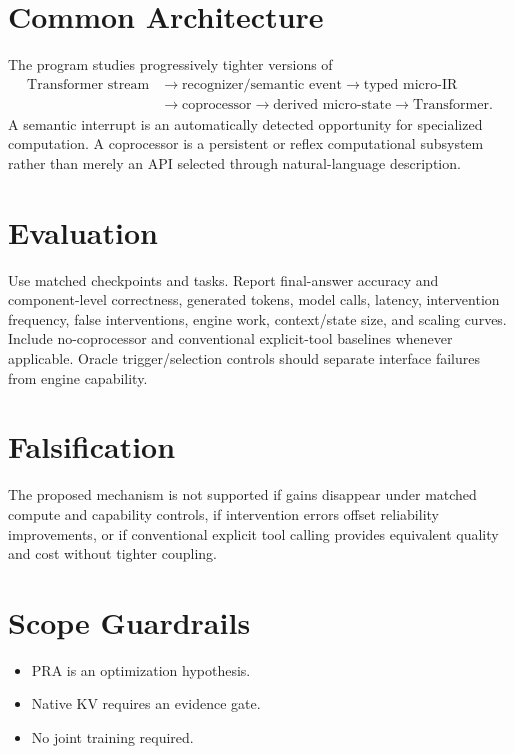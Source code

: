 \documentclass[11pt]{article}
\begin{document}
\section{Common Architecture}
The program studies progressively tighter versions of
\[
\begin{aligned}
\text{Transformer stream}
&\rightarrow \text{recognizer/semantic event}
\rightarrow \text{typed micro-IR} \\
&\rightarrow \text{coprocessor}
\rightarrow \text{derived micro-state}
\rightarrow \text{Transformer}.
\end{aligned}
\]
A semantic interrupt is an automatically detected opportunity for specialized computation. A coprocessor is a persistent or reflex computational subsystem rather than merely an API selected through natural-language description.

\section{Evaluation}
Use matched checkpoints and tasks. Report final-answer accuracy and component-level correctness, generated tokens, model calls, latency, intervention frequency, false interventions, engine work, context/state size, and scaling curves. Include no-coprocessor and conventional explicit-tool baselines whenever applicable. Oracle trigger/selection controls should separate interface failures from engine capability.

\section{Falsification}
The proposed mechanism is not supported if gains disappear under matched compute and capability controls, if intervention errors offset reliability improvements, or if conventional explicit tool calling provides equivalent quality and cost without tighter coupling.

\section{Scope Guardrails}
\begin{itemize}
\item PRA is an optimization hypothesis.
\item Native KV requires an evidence gate.
\item No joint training required.
\end{itemize}
\end{document}
